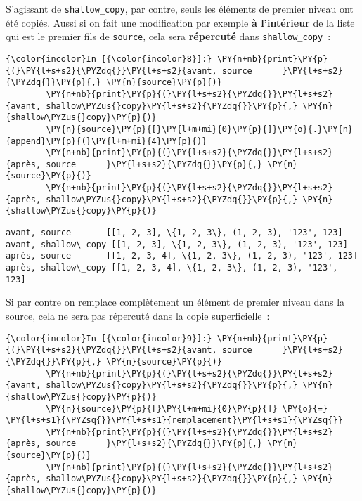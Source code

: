     S'agissant de \texttt{shallow\_copy}, par contre, seuls les éléments de
premier niveau ont été copiés. Aussi si on fait une modification par
exemple \textbf{à l'intérieur} de la liste qui est le premier fils de
\texttt{source}, cela sera \textbf{répercuté} dans
\texttt{shallow\_copy}~:

    \begin{Verbatim}[commandchars=\\\{\}]
{\color{incolor}In [{\color{incolor}8}]:} \PY{n+nb}{print}\PY{p}{(}\PY{l+s+s2}{\PYZdq{}}\PY{l+s+s2}{avant, source      }\PY{l+s+s2}{\PYZdq{}}\PY{p}{,} \PY{n}{source}\PY{p}{)}
        \PY{n+nb}{print}\PY{p}{(}\PY{l+s+s2}{\PYZdq{}}\PY{l+s+s2}{avant, shallow\PYZus{}copy}\PY{l+s+s2}{\PYZdq{}}\PY{p}{,} \PY{n}{shallow\PYZus{}copy}\PY{p}{)}
        \PY{n}{source}\PY{p}{[}\PY{l+m+mi}{0}\PY{p}{]}\PY{o}{.}\PY{n}{append}\PY{p}{(}\PY{l+m+mi}{4}\PY{p}{)}
        \PY{n+nb}{print}\PY{p}{(}\PY{l+s+s2}{\PYZdq{}}\PY{l+s+s2}{après, source      }\PY{l+s+s2}{\PYZdq{}}\PY{p}{,} \PY{n}{source}\PY{p}{)}
        \PY{n+nb}{print}\PY{p}{(}\PY{l+s+s2}{\PYZdq{}}\PY{l+s+s2}{après, shallow\PYZus{}copy}\PY{l+s+s2}{\PYZdq{}}\PY{p}{,} \PY{n}{shallow\PYZus{}copy}\PY{p}{)}
\end{Verbatim}


    \begin{Verbatim}[commandchars=\\\{\}]
avant, source       [[1, 2, 3], \{1, 2, 3\}, (1, 2, 3), '123', 123]
avant, shallow\_copy [[1, 2, 3], \{1, 2, 3\}, (1, 2, 3), '123', 123]
après, source       [[1, 2, 3, 4], \{1, 2, 3\}, (1, 2, 3), '123', 123]
après, shallow\_copy [[1, 2, 3, 4], \{1, 2, 3\}, (1, 2, 3), '123', 123]

    \end{Verbatim}

    Si par contre on remplace complètement un élément de premier niveau dans
la source, cela ne sera pas répercuté dans la copie superficielle~:

    \begin{Verbatim}[commandchars=\\\{\}]
{\color{incolor}In [{\color{incolor}9}]:} \PY{n+nb}{print}\PY{p}{(}\PY{l+s+s2}{\PYZdq{}}\PY{l+s+s2}{avant, source      }\PY{l+s+s2}{\PYZdq{}}\PY{p}{,} \PY{n}{source}\PY{p}{)}
        \PY{n+nb}{print}\PY{p}{(}\PY{l+s+s2}{\PYZdq{}}\PY{l+s+s2}{avant, shallow\PYZus{}copy}\PY{l+s+s2}{\PYZdq{}}\PY{p}{,} \PY{n}{shallow\PYZus{}copy}\PY{p}{)}
        \PY{n}{source}\PY{p}{[}\PY{l+m+mi}{0}\PY{p}{]} \PY{o}{=} \PY{l+s+s1}{\PYZsq{}}\PY{l+s+s1}{remplacement}\PY{l+s+s1}{\PYZsq{}}
        \PY{n+nb}{print}\PY{p}{(}\PY{l+s+s2}{\PYZdq{}}\PY{l+s+s2}{après, source      }\PY{l+s+s2}{\PYZdq{}}\PY{p}{,} \PY{n}{source}\PY{p}{)}
        \PY{n+nb}{print}\PY{p}{(}\PY{l+s+s2}{\PYZdq{}}\PY{l+s+s2}{après, shallow\PYZus{}copy}\PY{l+s+s2}{\PYZdq{}}\PY{p}{,} \PY{n}{shallow\PYZus{}copy}\PY{p}{)}
\end{Verbatim}


